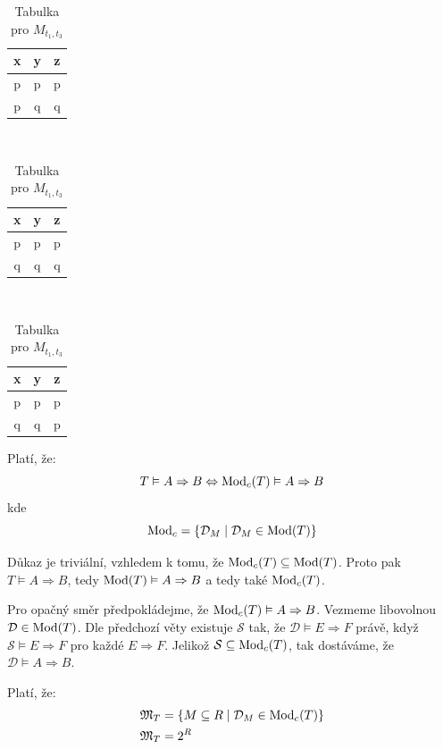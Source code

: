 \begin{table}
\caption{Výsledek příkladu \ref{ex:fun2}}\label{tab:existres}
\begin{subtable}[t]{0.3\textwidth}
\centering
\caption{Tabulka pro $M_{t_{1}, t_{2}}$}
\begin{tabular}{c c c}
x & y & z \\
\hline
p & p & p \\
p & q & q
\end{tabular}
\end{subtable}
~
\begin{subtable}[t]{0.3\textwidth}
\centering
\caption{Tabulka pro $M_{t_{2}, t_{3}}$}
\begin{tabular}{c c c}
x & y & z \\
\hline
p & p & p \\
q & q & q
\end{tabular}
\end{subtable}
~
\begin{subtable}[t]{0.3\textwidth}
\centering
\caption{Tabulka pro $M_{t_{1}, t_{3}}$}
\begin{tabular}{c c c}
x & y & z \\
\hline
p & p & p \\
q & q & p
\end{tabular}
\end{subtable}
\end{table}
\begin{upquote}
Platí, že:
$$
T \vDash A \Rightarrow B \Leftrightarrow \operatorname{Mod} _{c}(T) \vDash A \Rightarrow B$$ kde $$ \operatorname{Mod} _{c} = \left\{ \mathcal{D}_{M} \; | \; \mathcal{D}_{M} \in \operatorname{Mod}(T) \right\}
$$
\end{upquote}
\begin{upproof}
Důkaz je triviální, vzhledem k tomu, že $\operatorname{Mod}_{c}(T) \subseteq \operatorname{Mod}(T)$. Proto pak $T \vDash A \Rightarrow B$, tedy $\operatorname{Mod}(T) \vDash A \Rightarrow B$ a tedy také $\operatorname{Mod}_{c}(T)$.

Pro opačný směr předpokládejme, že $\operatorname{Mod}_{c}(T) \vDash A \Rightarrow B$. Vezmeme libovolnou $\mathcal{D} \in \operatorname{Mod}(T)$. Dle předchozí věty existuje $\mathcal{S}$ tak, že $\mathcal{D} \vDash E \Rightarrow F$ právě, když $\mathcal{S} \vDash E \Rightarrow F$ pro každé $E \Rightarrow F$. Jelikož $\mathcal{S} \subseteq \operatorname{Mod}_{c}(T)$, tak dostáváme, že $\mathcal{D} \vDash A \Rightarrow B$.
\end{upproof}

\begin{uptheorem}\label{def:uza}
Platí, že:
\begin{align*}
\mathfrak{M}_{T} &= \left\{ M \subseteq R \; | \; \mathcal{D}_{M} \in \operatorname{Mod}_{c}(T) \right\} \\
\mathfrak{M}_{T} &= 2^{R}
\end{align*}
\end{uptheorem}

